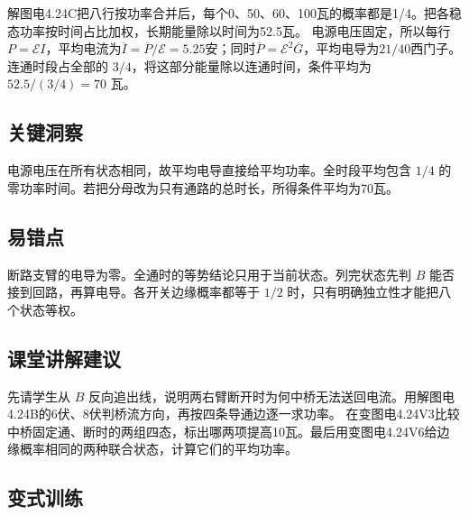 \documentclass[UTF8,fontset=fandol,a4paper,11pt]{ctexart}
\begin{document}
解图电4.24C把八行按功率合并后，每个0、50、60、100瓦的概率都是1/4。把各稳态功率按时间占比加权，长期能量除以时间为52.5瓦。
电源电压固定，所以每行$P=\mathcal E I$，平均电流为$\overline I=\overline P/\mathcal E=5.25$安；同时$\overline P=\mathcal E^2\overline G$，平均电导为$21/40$西门子。
连通时段占全部的 $3/4$，将这部分能量除以连通时间，条件平均为 $52.5/(3/4)=70$ 瓦。




\subsection*{关键洞察}

电源电压在所有状态相同，故平均电导直接给平均功率。全时段平均包含 $1/4$ 的零功率时间。若把分母改为只有通路的总时长，所得条件平均为70瓦。



\subsection*{易错点}

断路支臂的电导为零。全通时的等势结论只用于当前状态。列完状态先判 $B$ 能否接到回路，再算电导。各开关边缘概率都等于 $1/2$ 时，只有明确独立性才能把八个状态等权。



\subsection*{课堂讲解建议}

先请学生从 $B$ 反向追出线，说明两右臂断开时为何中桥无法送回电流。用解图电4.24B的6伏、8伏判桥流方向，再按四条导通边逐一求功率。
在变图电4.24V3比较中桥固定通、断时的两组四态，标出哪两项提高10瓦。最后用变图电4.24V6给边缘概率相同的两种联合状态，计算它们的平均功率。


\subsection*{变式训练}
\end{document}
